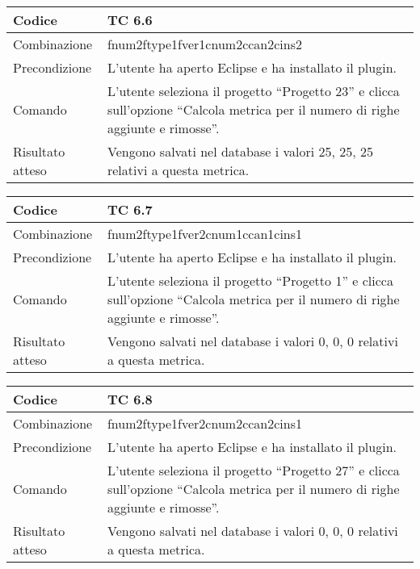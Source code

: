 \begin{table}[ht]
\begin{tabular}{|p{3cm}|p{9cm}|}
\hline
\cellcolor{lightgray}Codice				& TC 6.6								\\
\hline
\cellcolor{lightgray}Combinazione		& fnum2ftype1fver1cnum2ccan2cins2 									\\
\hline
\cellcolor{lightgray}Precondizione		& L'utente ha aperto Eclipse e ha installato il plugin.				\\
\hline
\cellcolor{lightgray}Comando			& L'utente seleziona il progetto ``Progetto 23''  e clicca sull'opzione ``Calcola metrica per il numero di righe aggiunte e rimosse''.	\\
\hline
\cellcolor{lightgray}Risultato atteso	& Vengono salvati nel database i valori 25, 25, 25 relativi a questa metrica.\\
\hline
\end{tabular}
\end{table}

\begin{table}[ht]
\begin{tabular}{|p{3cm}|p{9cm}|}
\hline
\cellcolor{lightgray}Codice				& TC 6.7								\\
\hline
\cellcolor{lightgray}Combinazione		& fnum2ftype1fver2cnum1ccan1cins1 									\\
\hline
\cellcolor{lightgray}Precondizione		& L'utente ha aperto Eclipse e ha installato il plugin.								\\
\hline
\cellcolor{lightgray}Comando			& L'utente seleziona il progetto ``Progetto 1''  e clicca sull'opzione ``Calcola metrica per il numero di righe aggiunte e rimosse''.	\\
\hline
\cellcolor{lightgray}Risultato atteso	& Vengono salvati nel database i valori 0, 0, 0 relativi a questa metrica.\\
\hline
\end{tabular}
\end{table}

\begin{table}[ht]
\begin{tabular}{|p{3cm}|p{9cm}|}
\hline
\cellcolor{lightgray}Codice				& TC 6.8								\\
\hline
\cellcolor{lightgray}Combinazione		& fnum2ftype1fver2cnum2ccan2cins1 									\\
\hline
\cellcolor{lightgray}Precondizione		& L'utente ha aperto Eclipse e ha installato il plugin.									\\
\hline
\cellcolor{lightgray}Comando			& L'utente seleziona il progetto ``Progetto 27''  e clicca sull'opzione ``Calcola metrica per il numero di righe aggiunte e rimosse''.	\\
\hline
\cellcolor{lightgray}Risultato atteso	& Vengono salvati nel database i valori 0, 0, 0 relativi a questa metrica.\\
\hline
\end{tabular}
\end{table}

